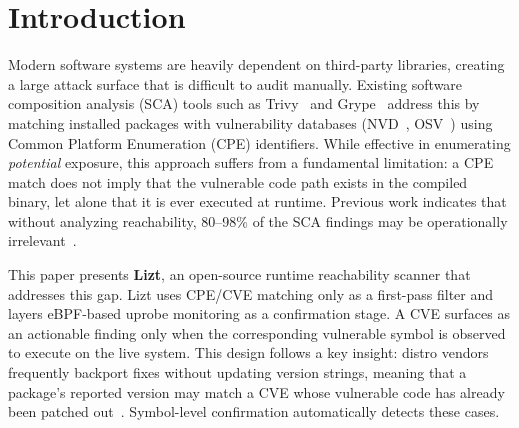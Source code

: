 \documentclass[conference]{IEEEtran}
\begin{document}
\section{Introduction}

Modern software systems are heavily dependent on third-party libraries, creating a large attack surface that is difficult to audit manually.
Existing software composition analysis (SCA) tools such as Trivy~\cite{trivy} and Grype~\cite{grype} address this by matching installed packages with vulnerability databases (NVD~\cite{nvd}, OSV~\cite{osv}) using Common Platform Enumeration (CPE) identifiers.
While effective in enumerating \textit{potential} exposure, this approach suffers from a fundamental limitation: a CPE match does not imply that the vulnerable code path exists in the compiled binary, let alone that it is ever executed at runtime.
Previous work indicates that without analyzing reachability, 80--98\% of the SCA findings may be operationally irrelevant~\cite{konvu2026}.

This paper presents \textbf{Lizt}, an open-source runtime reachability scanner that addresses this gap.
Lizt uses CPE/CVE matching only as a first-pass filter and layers eBPF-based uprobe monitoring as a confirmation stage.
A CVE surfaces as an actionable finding only when the corresponding vulnerable symbol is observed to execute on the live system.
This design follows a key insight: distro vendors frequently backport fixes without updating version strings, meaning that a package's reported version may match a CVE whose vulnerable code has already been patched out~\cite{redhat_backporting}.
Symbol-level confirmation automatically detects these cases.
\end{document}
